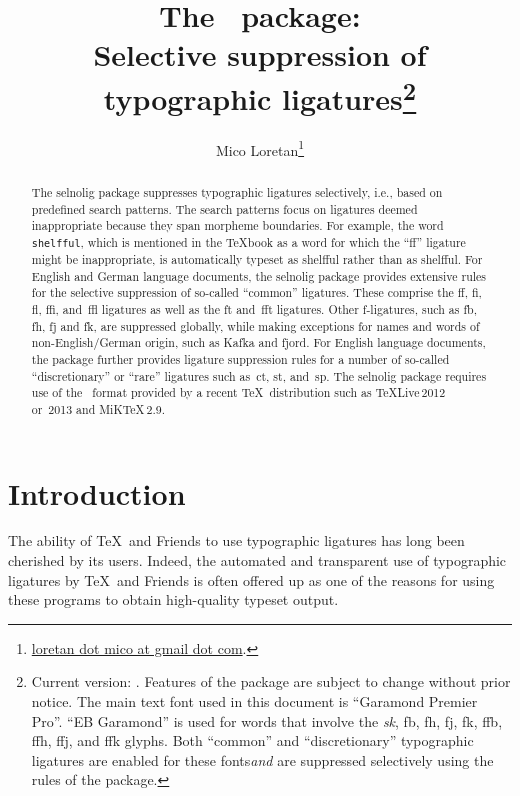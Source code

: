 \documentclass[11pt]{article}
\title{The \selnoligpackagename\ package: \\
Selective suppression of typographic ligatures\thanks{
Current version: \selnoligpackageversion. Features of the \pkg{selnolig} package are subject to change without prior notice. 
\newline\hspace*{\parindent}
The main text font used in this document is \enquote{Garamond Premier Pro}. \enquote{\ebg EB Garamond} is used for words that involve the \emph{\mbox{\ebg sk}}, {\ebg \mbox{fb}, \mbox{fh}, \mbox{fj}, \mbox{fk}, \mbox{ffb}, \mbox{ffh}, \mbox{ffj}, and \mbox{ffk}} glyphs. Both \enquote{common} and \enquote{discretionary} typographic ligatures are enabled for these fonts\textemdash \emph{and} are suppressed selectively using the rules of the \pkg{selnolig} package.}}
\author{Mico Loretan\thanks{
\href{mailto:loretan.mico@gmail.com}{loretan dot mico at gmail dot com}.}}
\date{\selnoligpackagedate}
\newcommand{\pkg}[1]{\textsf{#1}}
\newcommand{\opt}[1]{\texttt{#1}}
\begin{document}
\VerbatimFootnotes
{}
\maketitle


\begin{abstract}

The \pkg{selnolig} package suppresses typographic ligatures selectively, i.e., based on predefined search patterns. The search patterns focus on ligatures deemed inappropriate because they span morpheme boundaries. For example, the word \opt{shelfful}, which is mentioned in the \TeX book as a word for which the \enquote{ff} ligature might be inappropriate, is automatically typeset as shelfful rather than as shel\mbox{ff}ul.
\newline\hspace*{\parindent}
For English and German language documents, the \pkg{selnolig} package provides extensive rules for the selective suppression of so-called \enquote{common} ligatures. These comprise the ff, fi, fl, ffi, and~ffl ligatures as well as the ft and~fft ligatures. Other f-ligatures, such as {\ebg\mbox{fb}, \mbox{fh}, \mbox{fj}} and {\ebg\mbox{fk}}, are suppressed globally, while making exceptions for names and words of non-English/German origin, such as {\ebg Kafka} and {\ebg fjord}.
\newline\hspace*{\parindent}
For English language documents, the package further provides ligature suppression rules for a number of so-called \enquote{discretionary} or \enquote{rare} ligatures such as~ct, st, and~sp.
\newline\hspace*{\parindent}
The \pkg{selnolig} package requires use of the \LuaLaTeX\ format provided by a recent \TeX\ distribution such as \TeX Live\,2012 or~2013 and MiK\TeX\,2.9.
\end{abstract}

\tableofcontents

\clearpage
{}

\section{Introduction}

The ability of \TeX\ and Friends to use typographic ligatures has long been cherished by its users. Indeed, the automated and transparent use of typographic ligatures by \TeX\ and Friends is often offered up as one of the reasons for using these programs to obtain high-quality typeset output.
\end{document}
